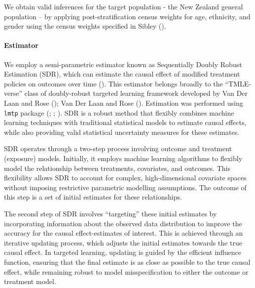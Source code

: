 \documentclass[
  singlecolumn]{article}
\let\oldparagraph\paragraph
\renewcommand{\paragraph}[1]{\oldparagraph{#1}\mbox{}}
\begin{document}
We obtain valid inferences for the target population - the New Zealand
general population -- by applying post-stratification census weights for
age, ethnicity, and gender using the census weights specified in Sibley
().

\paragraph{Estimator}\label{estimator}

We employ a semi-parametric estimator known as Sequentially Doubly
Robust Estimation (SDR), which can estimate the causal effect of
modified treatment policies on outcomes over time
(). This estimator
belongs broadly to the ``TMLE-verse'' class of doubly-robust targeted
learning framework developed by Van Der Laan and Rose
(); Van Der Laan and Rose
(). Estimation was performed using
\texttt{lmtp} package (; ;
). SDR is a robust
method that flexibly combines machine learning techniques with
traditional statistical models to estimate causal effects, while also
providing valid statistical uncertainty measures for these estimates.

SDR operates through a two-step process involving outcome and treatment
(exposure) models. Initially, it employs machine learning algorithms to
flexibly model the relationship between treatments, covariates, and
outcomes. This flexibility allows SDR to account for complex,
high-dimensional covariate spaces without imposing restrictive
parametric modelling assumptions. The outcome of this step is a set of
initial estimates for these relationships.

The second step of SDR involves ``targeting'' these initial estimates by
incorporating information about the observed data distribution to
improve the accuracy for the causal effect-estimates of interest. This
is achieved through an iterative updating process, which adjusts the
initial estimates towards the true causal effect. In targeted learning,
updating is guided by the efficient influence function, ensuring that
the final estimate is as close as possible to the true causal effect,
while remaining robust to model misspecification to either the outcome
or treatment model.
\end{document}
